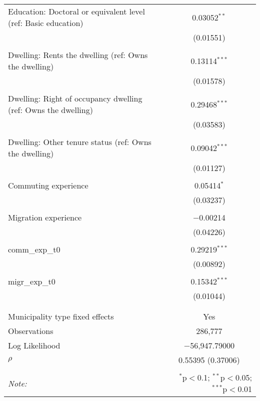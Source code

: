 \begin{table}[!htbp]
\begin{tabular}{@{\extracolsep{5pt}}lc}
 Education: Doctoral or equivalent level (ref: Basic education) & 0.03052$^{**}$ \\ 
  & (0.01551) \\ 
  & \\ 
 Dwelling: Rents the dwelling (ref: Owns the dwelling) & 0.13114$^{***}$ \\ 
  & (0.01578) \\ 
  & \\ 
 Dwelling: Right of occupancy dwelling (ref: Owns the dwelling) & 0.29468$^{***}$ \\ 
  & (0.03583) \\ 
  & \\ 
 Dwelling: Other tenure status (ref: Owns the dwelling) & 0.09042$^{***}$ \\ 
  & (0.01127) \\ 
  & \\ 
 Commuting experience & 0.05414$^{*}$ \\ 
  & (0.03237) \\ 
  & \\ 
 Migration experience & $-$0.00214 \\ 
  & (0.04226) \\ 
  & \\ 
 comm\_exp\_t0 & 0.29219$^{***}$ \\ 
  & (0.00892) \\ 
  & \\ 
 migr\_exp\_t0 & 0.15342$^{***}$ \\ 
  & (0.01044) \\ 
  & \\ 
\hline \\[-1.8ex] 
Municipality type fixed effects & Yes \\ 
Observations & 286,777 \\ 
Log Likelihood & $-$56,947.79000 \\ 
$\rho$ & 0.55395  (0.37006) \\ 
\hline 
\hline \\[-1.8ex] 
\textit{Note:}  & \multicolumn{1}{r}{$^{*}$p$<$0.1; $^{**}$p$<$0.05; $^{***}$p$<$0.01} \\ 
\end{tabular} 
\end{table} 
